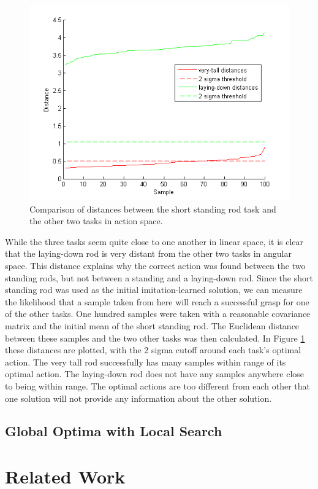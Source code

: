 \documentclass[12pt]{article}
\begin{document}
\begin{figure}[ht]
  \centering
  \includegraphics[width=0.8\columnwidth]{distance.png}
  \caption{\label{fig_label} Comparison of distances between the short standing rod task and the other two tasks in action space.}
  \label{fig:distance}
\end{figure}

\newpage
While the three tasks seem quite close to one another in linear space, it is clear that the laying-down rod is very distant from the other two tasks in angular space. This distance explains why the correct action was found between the two standing rods, but not between a standing and a laying-down rod. Since the short standing rod was used as the initial imitation-learned solution, we can measure the likelihood that a sample taken from here will reach a successful grasp for one of the other tasks. One hundred samples were taken with a reasonable covariance matrix and the initial mean of the short standing rod. The Euclidean distance between these samples and the two other tasks was then calculated. In Figure \ref{fig:distance} these distances are plotted, with the 2 sigma cutoff around each task's optimal action. The very tall rod successfully has many samples within range of its optimal action. The laying-down rod does not have any samples anywhere close to being within range. The optimal actions are too different from each other that one solution will not provide any information about the other solution.

\subsection{Global Optima with Local Search}


\section{Related Work}
\end{document}
